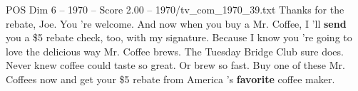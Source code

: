 \begin{textsample}{POS Dim 6 – 1970 – Score 2.00 – 1970/tv\_com\_1970\_39.txt}  \label{ex:f6_pos_034}
Thanks for the rebate, Joe.
You 're welcome.
And now when you buy a Mr.
Coffee, I 'll \textbf{send} you a \$5 rebate check, too, with my signature.
Because I know you 're going to love the delicious way Mr.
Coffee brews.
The Tuesday Bridge Club sure does.
Never knew coffee could taste so great.
Or brew so fast.
Buy one of these Mr.
Coffees now and get your \$5 rebate from America 's \textbf{favorite} coffee maker.

\end{textsample}
